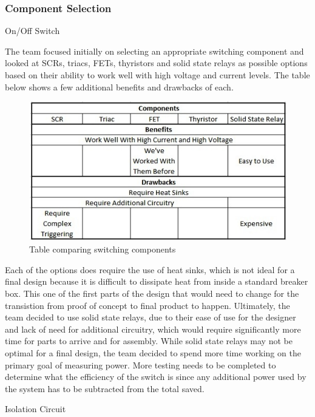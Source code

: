 \subsubsection{Component Selection}
On/Off Switch

The team focused initially on selecting an appropriate switching component and looked at SCRs, triacs, FETs, thyristors and solid state relays as possible options based on their ability to work well with high voltage and current levels. The table below shows a few additional benefits and drawbacks of each.

\begin{figure}[htbp]
\begin{center}
\includegraphics[width=5in]{includes/NJSwitchComponentOptions}
\caption{Table comparing switching components}
\label{fig:switch_component_options}  
\end{center}
\end{figure}

Each of the options does require the use of heat sinks, which is not ideal for a final design because it is difficult to dissipate heat from inside a standard breaker box. This one of the first parts of the design that would need to change for the transistion from proof of concept to final product to happen. Ultimately, the team decided to use solid state relays, due to their ease of use for the designer and lack of need for additional circuitry, which would require significantly more time for parts to arrive and for assembly. While solid state relays may not be optimal for a final design, the team decided to spend more time working on the primary goal of measuring power. More testing needs to be completed to determine what the efficiency of the switch is since any additional power used by the system has to be subtracted from the total saved. 

Isolation Circuit

